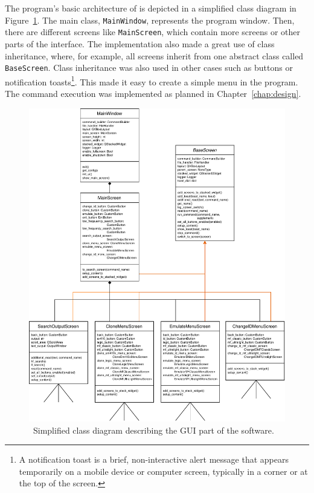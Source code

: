 The program's basic architecture of is depicted in a simplified class diagram in Figure~\ref{fig:classdiagram}. The main class, \texttt{MainWindow}, represents the program window. Then, there are different screens like \texttt{MainScreen}, which contain more screens or other parts of the interface. The implementation also made a great use of class inheritance, where, for example, all screens inherit from one abstract class called \texttt{BaseScreen}. Class inheritance was also used in other cases such as buttons or notification toasts\footnote{A notification toast is a brief, non-interactive alert message that appears temporarily on a mobile device or computer screen, typically in a corner or at the top of the screen.}. This made it easy to create a simple menu in the program. The command execution was implemented as planned in Chapter~\ref{chap:design}.

\begin{figure}[hp]
  \centering
  \includegraphics[width=\textwidth]{text/implementation/uml_class_diagram.pdf}
  \caption{~Simplified class diagram describing the GUI part of the software.}
  \label{fig:classdiagram}
\end{figure}

